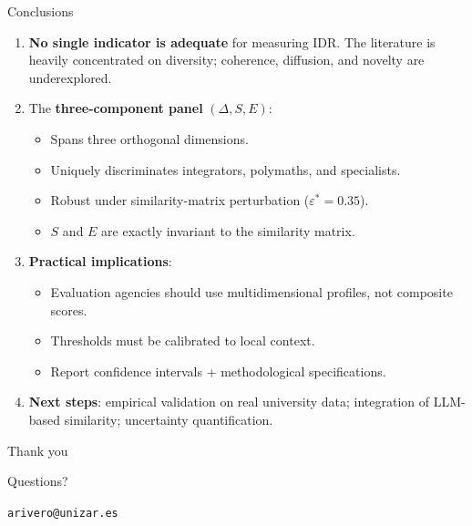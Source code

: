 \documentclass[aspectratio=169,10pt]{beamer}
\begin{document}
\begin{frame}{Conclusions}
\begin{enumerate}
  \item \textbf{No single indicator is adequate} for measuring IDR.
        The literature is heavily concentrated on diversity;
        coherence, diffusion, and novelty are underexplored.
  \item The \textbf{three-component panel} $(\Delta, S, E)$:
  \begin{itemize}
    \item Spans three orthogonal dimensions.
    \item Uniquely discriminates integrators, polymaths, and specialists.
    \item Robust under similarity-matrix perturbation ($\varepsilon^* = 0.35$).
    \item $S$ and $E$ are exactly invariant to the similarity matrix.
  \end{itemize}
  \item \textbf{Practical implications}:
  \begin{itemize}
    \item Evaluation agencies should use multidimensional profiles,
          not composite scores.
    \item Thresholds must be calibrated to local context.
    \item Report confidence intervals + methodological specifications.
  \end{itemize}
  \item \textbf{Next steps}: empirical validation on real university data;
        integration of LLM-based similarity; uncertainty quantification.
\end{enumerate}
\end{frame}

\begin{frame}{}
\vfill
\centering
{\Huge Thank you}

\bigskip
{\large Questions?}

\bigskip
\texttt{arivero@unizar.es}
\vfill
\end{frame}
\end{document}
